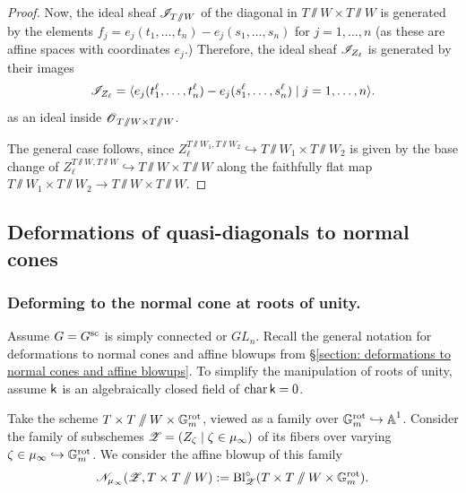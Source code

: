 \begin{proof}
Now, the ideal sheaf $\eI_{T\sslash W}$ of the diagonal in $T\sslash W \times T\sslash W$ is generated by the elements $f_j = e_j(t_1, \dots, t_n) - e_j(s_1, \dots, s_n)$ for $j = 1, \dots, n$ (as these are affine spaces with coordinates $e_j$.) Therefore, the ideal sheaf $\eI_{Z_{\ell}}$ is generated by their images
\begin{equation*}
    \eI_{Z_{\ell}} = \langle e_j(t^{\ell}_1, \dots, t^{\ell}_n) - e_j(s^{\ell}_1, \dots, s^{\ell}_n) \mid j = 1, \dots, n \rangle.
\end{equation*}
as an ideal inside $\O_{T\sslash W \times T \sslash W}$. 


The general case follows, since $Z_{\ell}^{T \sslash W_1, T \sslash W_2} \hookrightarrow T \sslash W_1 \times T \sslash W_2$ is given by the base change of $Z_{\ell}^{T \sslash W, T \sslash W} \hookrightarrow T \sslash W \times T \sslash W$ along the faithfully flat map $T \sslash W_1 \times T \sslash W_2 \to T \sslash W \times T \sslash W$.
\end{proof}



\subsection{Deformations of quasi-diagonals to normal cones}\label{section: deformations of quasi-diagonals to normal cones}

\subsubsection{Deforming to the normal cone at roots of unity.}
Assume $G=G^{\sc}$ is simply connected or $GL_n$.
Recall the general notation for deformations to normal cones and affine blowups from \S \ref{section: deformations to normal cones and affine blowups}. To simplify the manipulation of roots of unity, assume $\k$ is an algebraically closed field of $\chara \k = 0$.

\begin{definition}\label{definition: deformation to normal cone at roots of unity}
Take the scheme $T \times T \sslash W \times \Gm^{\rot}$, viewed as a family over $\Gm^{\rot} \hookrightarrow \A^1$. Consider the family of subschemes $\eZ = (Z_{\zeta} \mid \zeta \in \mu_{\infty})$ of its fibers over varying $\zeta \in \mu_{\infty} \hookrightarrow \Gm^{\rot}$. We consider the affine blowup of this family
\begin{equation*}
    \eN_{\mu_{\infty}}(\eZ, T \times T \sslash W) := \Bl^{\circ}_{\eZ}(T \times T \sslash W \times \Gm^{\rot}).
\end{equation*}
\end{definition}

